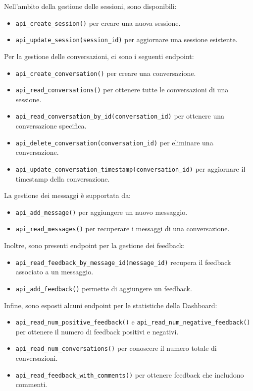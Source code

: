 Nell’ambito della gestione delle sessioni, sono disponibili:
\begin{itemize}
    \item \texttt{api\_create\_session()} per creare una nuova sessione.
    \item \texttt{api\_update\_session(session\_id)} per aggiornare una sessione esistente.
\end{itemize}

Per la gestione delle conversazioni, ci sono i seguenti endpoint:
\begin{itemize}
    \item \texttt{api\_create\_conversation()} per creare una conversazione.
    \item \texttt{api\_read\_conversations()} per ottenere tutte le conversazioni di una sessione.
    \item \texttt{api\_read\_conversation\_by\_id(conversation\_id)} per ottenere una conversazione specifica.
    \item \texttt{api\_delete\_conversation(conversation\_id)} per eliminare una conversazione.
    \item \texttt{api\_update\_conversation\_timestamp(conversation\_id)} per aggiornare il timestamp della conversazione.
\end{itemize}

La gestione dei messaggi è supportata da:
\begin{itemize}
    \item \texttt{api\_add\_message()} per aggiungere un nuovo messaggio.
    \item \texttt{api\_read\_messages()} per recuperare i messaggi di una conversazione.
\end{itemize}

Inoltre, sono presenti endpoint per la gestione dei feedback:
\begin{itemize}
    \item \texttt{api\_read\_feedback\_by\_message\_id(message\_id)} recupera il feedback associato a un messaggio.
    \item \texttt{api\_add\_feedback()} permette di aggiungere un feedback.
\end{itemize}

Infine, sono esposti alcuni endpoint per le statistiche della Dashboard:
\begin{itemize}
    \item \texttt{api\_read\_num\_positive\_feedback()} e \texttt{api\_read\_num\_negative\_feedback()} per ottenere il numero di feedback positivi e negativi.
    \item \texttt{api\_read\_num\_conversations()} per conoscere il numero totale di conversazioni.
    \item \texttt{api\_read\_feedback\_with\_comments()} per ottenere feedback che includono commenti.
\end{itemize}

